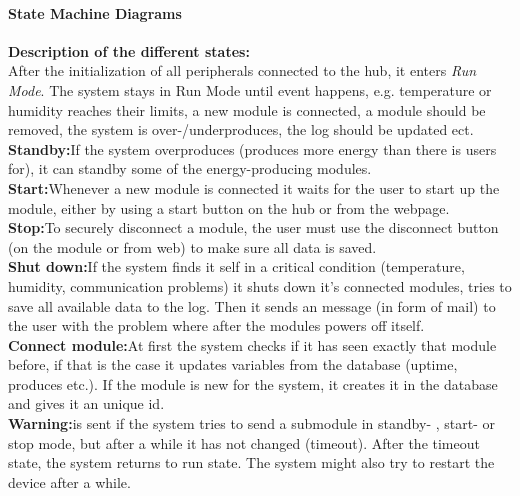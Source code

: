 			\paragraph{State Machine Diagrams}
				\textbf{Description of the different states:}
				\\ After the initialization of all peripherals connected to the hub, it enters \textit{Run Mode}.
				The system stays in Run Mode until event happens, e.g. temperature or humidity reaches their limits,
				a new module is connected, a module should be removed, the system is over-/underproduces, the log should be updated ect. 
				\\\textbf{Standby:}If the system overproduces (produces more energy than there is users for), it can standby some of the energy-producing modules.
				\\\textbf{Start:}Whenever a new module is connected it waits for the user to start up the module, either by using a start button on the hub or from the webpage.
				\\\textbf{Stop:}To securely disconnect a module, the user must use the disconnect button (on the module or from web) to make sure all data is saved.
				\\\textbf{Shut down:}If the system finds it self in a critical condition (temperature, humidity, communication problems) it shuts down it's connected modules,
							        tries to save all available data to the log. Then it sends an message (in form of mail) to the user with the problem where after the modules
							        powers off itself. 
				\\\textbf{Connect module:}At first the system checks if it has seen exactly that module before, if that is the case it updates variables from the database
									(uptime, produces etc.). If the module is new for the system, it creates it in the database and gives it an unique id.
				\\\textbf{Warning:}is sent if the system tries to send a submodule in standby- , start- or stop mode, but after a while it has not changed (timeout). 
							    After the timeout state, the system returns to run state. The system might also try to restart the device after a while.
				
